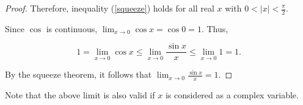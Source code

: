 \documentclass[12pt]{article}
\begin{document}
\begin{proof}
Therefore, inequality (\ref{squeeze}) holds for all real $x$ with $\displaystyle 0<|x|<\frac{\pi}{2}$.

Since $\cos$ is continuous, $\displaystyle \lim_{x \to 0} \cos x=\cos 0=1$.  Thus,

\begin{equation}
\label{limits}
1=\lim_{x \to 0} \cos x \le \lim_{x \to 0} \frac{\sin x}{x} \le \lim_{x \to 0} 1=1.
\end{equation}

By the squeeze theorem, it follows that $\displaystyle \lim_{x \to 0} \frac{\sin x}{x}=1$.
\end{proof}

Note that the above limit is also valid if $x$ is considered as a complex variable.
\end{document}
